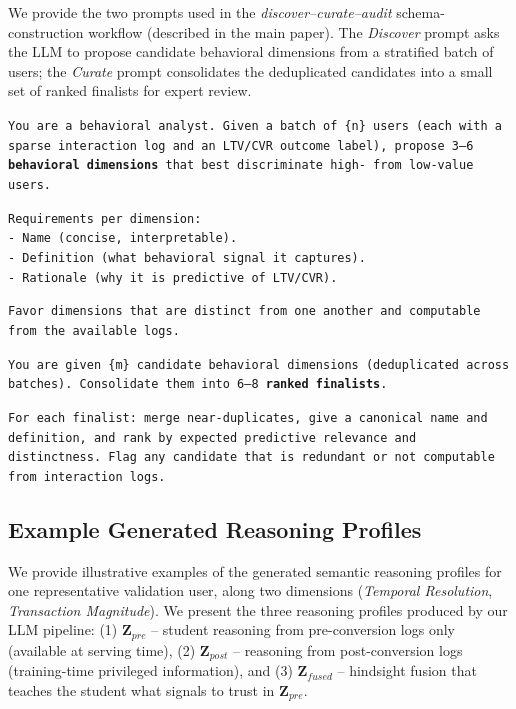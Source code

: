 We provide the two prompts used in the \emph{discover--curate--audit} schema-construction workflow (described in the main paper). The \emph{Discover} prompt asks the LLM to propose candidate behavioral dimensions from a stratified batch of users; the \emph{Curate} prompt consolidates the deduplicated candidates into a small set of ranked finalists for expert review.

\begin{tcolorbox}[colback=gray!10, colframe=gray!50, title=System Prompt: Dimension Discovery]
\small
\texttt{You are a behavioral analyst. Given a batch of \{n\} users (each with a sparse interaction log and an LTV/CVR outcome label), propose 3--6 \textbf{behavioral dimensions} that best discriminate high- from low-value users.}

\texttt{Requirements per dimension:} \\
\texttt{- Name (concise, interpretable).} \\
\texttt{- Definition (what behavioral signal it captures).} \\
\texttt{- Rationale (why it is predictive of LTV/CVR).}

\texttt{Favor dimensions that are distinct from one another and computable from the available logs.}
\end{tcolorbox}

\begin{tcolorbox}[colback=gray!10, colframe=gray!50, title=System Prompt: Dimension Consolidation]
\small
\texttt{You are given \{m\} candidate behavioral dimensions (deduplicated across batches). Consolidate them into 6--8 \textbf{ranked finalists}.}

\texttt{For each finalist: merge near-duplicates, give a canonical name and definition, and rank by expected predictive relevance and distinctness. Flag any candidate that is redundant or not computable from interaction logs.}
\end{tcolorbox}

\subsection{Example Generated Reasoning Profiles}
\label{app:profile_examples}

We provide illustrative examples of the generated semantic reasoning profiles for one representative validation user, along two dimensions (\textit{Temporal Resolution}, \textit{Transaction Magnitude}). We present the three reasoning profiles produced by our LLM pipeline: (1) \textbf{$\mathbf{Z}_{pre}$} -- student reasoning from pre-conversion logs only (available at serving time), (2) \textbf{$\mathbf{Z}_{post}$} -- reasoning from post-conversion logs (training-time privileged information), and (3) \textbf{$\mathbf{Z}_{fused}$} -- hindsight fusion that teaches the student what signals to trust in $\mathbf{Z}_{pre}$.

